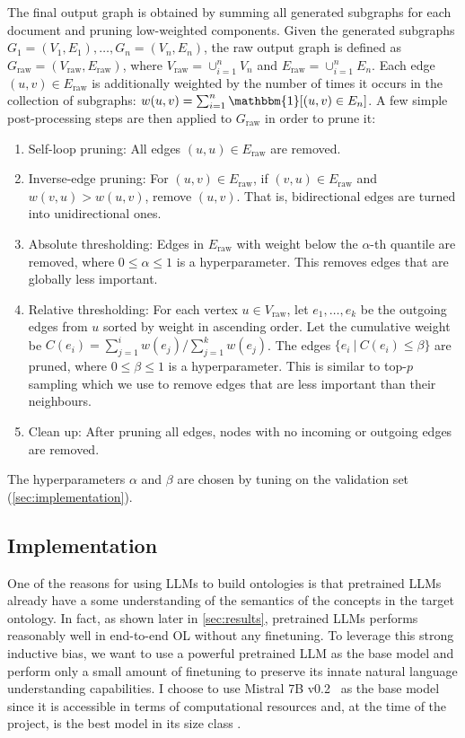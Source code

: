 The final output graph is obtained by summing all generated subgraphs for each document and pruning low-weighted components. Given the generated subgraphs $G_1 = (V_1, E_1), \dots, G_n = (V_n, E_n)$, the raw output graph is defined as $G_\text{raw} = (V_\text{raw}, E_\text{raw})$, where $V_\text{raw} = \cup_{i=1}^n V_n$ and $E_\text{raw} = \cup_{i=1}^n E_n$. Each edge $(u, v) \in E_\text{raw}$ is additionally weighted by the number of times it occurs in the collection of subgraphs: $w(u, v) = \sum_{i=1}^n \mathbbm{1}[(u,v) \in E_n]$. A few simple post-processing steps are then applied to $G_\text{raw}$ in order to prune it:
\begin{enumerate}[leftmargin=*]
    \item Self-loop pruning: All edges $(u, u) \in E_\text{raw}$ are removed.
    \item Inverse-edge pruning: For $(u, v) \in E_\text{raw}$, if $(v, u) \in E_\text{raw}$ and $w(v, u) > w(u, v)$, remove $(u, v)$. That is, bidirectional edges are turned into unidirectional ones.
    \item Absolute thresholding: Edges in $E_\text{raw}$ with weight below the $\alpha$-th quantile are removed, where $0 \leq \alpha \leq 1$ is a hyperparameter. This removes edges that are globally less important.
    \item Relative thresholding: For each vertex $u \in V_\text{raw}$, let $e_1, \dots, e_k$ be the outgoing edges from $u$ sorted by weight in ascending order. Let the cumulative weight be $C(e_i) = \sum_{j=1}^i w(e_j) / \sum_{j=1}^k w(e_j)$. The edges $\{e_i\ |\ C(e_i) \leq \beta\}$ are pruned, where $0 \leq \beta \leq 1$ is a hyperparameter. This is similar to top-$p$ sampling \cite{holtzman2019curious} which we use to remove edges that are less important than their neighbours.
    \item Clean up: After pruning all edges, nodes with no incoming or outgoing edges are removed.
\end{enumerate}
The hyperparameters $\alpha$ and $\beta$ are chosen by tuning on the validation set (\cref{sec:implementation}).


\subsection{Implementation}

One of the reasons for using LLMs to build ontologies is that pretrained LLMs already have a some understanding of the semantics of the concepts in the target ontology. In fact, as shown later in \cref{sec:results}, pretrained LLMs performs reasonably well in end-to-end OL without any finetuning. To leverage this strong inductive bias, we want to use a powerful pretrained LLM as the base model and perform only a small amount of finetuning to preserve its innate natural language understanding capabilities. I choose to use Mistral 7B v0.2~\cite{jiang2023mistral} as the base model since it is accessible in terms of computational resources and, at the time of the project, is the best model in its size class \cite{chiang2024chatbot}.

